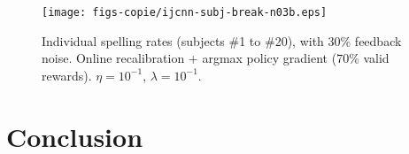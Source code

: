 \documentclass[conference]{IEEEtran}
\begin{document}
\begin{figure}[t!]
	\centerline{
					\texttt{[image: figs-copie/ijcnn-subj-break-n03b.eps]}	
				}	
	\caption{Individual spelling rates (subjects \#1 to \#20), with 30\% feedback noise. Online recalibration + argmax policy gradient (70\% valid rewards).	$\eta = 10^{-1}$, $\lambda = 10^{-1}$.}
	\label{fig:indiv-n03}
\end{figure}



\section{Conclusion}
\end{document}

